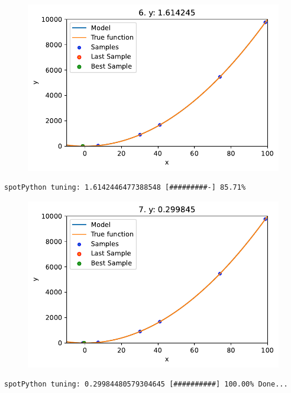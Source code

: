 \documentclass[
  letterpaper,
  DIV=11,
  numbers=noendperiod]{scrreprt}
\begin{document}
\begin{figure}[H]

{\centering \includegraphics{a_04_spot_doc_files/figure-pdf/cell-6-output-2.pdf}

}

\end{figure}

\begin{verbatim}
spotPython tuning: 1.6142446477388548 [#########-] 85.71% 
\end{verbatim}

\begin{figure}[H]

{\centering \includegraphics{a_04_spot_doc_files/figure-pdf/cell-6-output-4.pdf}

}

\end{figure}

\begin{verbatim}
spotPython tuning: 0.29984480579304645 [##########] 100.00% Done...
\end{verbatim}
\end{document}
